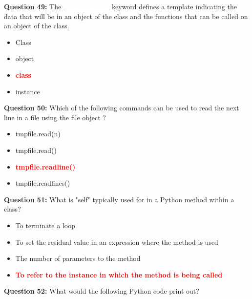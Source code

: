 \documentclass[12pt,a4paper]{article}
\begin{document}
\vspace{0.5cm}

\textbf{Question 49:} The _________ keyword defines a template indicating the data that will be in an object of the class and the functions that can be called on an object of the class.

\begin{itemize}
    \item[\textbf{A.}] Class
    \item[\textbf{B.}] object
    \item[\textbf{C.}] \textcolor{red}{\textbf{class}}
    \item[\textbf{D.}] instance
\end{itemize}

\vspace{0.5cm}

\textbf{Question 50:} Which of the following commands can be used to read the next line in a file using the file object ?

\begin{itemize}
    \item[\textbf{A.}] tmpfile.read(n)
    \item[\textbf{B.}] tmpfile.read()
    \item[\textbf{C.}] \textcolor{red}{\textbf{tmpfile.readline()}}
    \item[\textbf{D.}] tmpfile.readlines()
\end{itemize}

\vspace{0.5cm}

\textbf{Question 51:} What is "self" typically used for in a Python method within a class?

\begin{itemize}
    \item[\textbf{A.}] To terminate a loop
    \item[\textbf{B.}] To set the residual value in an expression where the method is used
    \item[\textbf{C.}] The number of parameters to the method
    \item[\textbf{D.}] \textcolor{red}{\textbf{To refer to the instance in which the method is being called}}
\end{itemize}

\vspace{0.5cm}

\textbf{Question 52:} What would the following Python code print out?\newline
\end{document}
